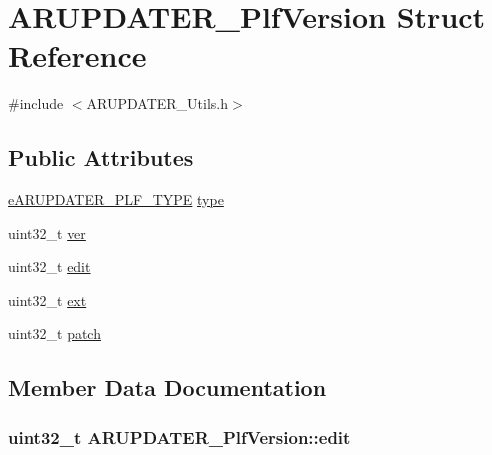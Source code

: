 \hypertarget{struct_a_r_u_p_d_a_t_e_r___plf_version}{}\section{A\+R\+U\+P\+D\+A\+T\+E\+R\+\_\+\+Plf\+Version Struct Reference}
\label{struct_a_r_u_p_d_a_t_e_r___plf_version}


{\ttfamily \#include $<$A\+R\+U\+P\+D\+A\+T\+E\+R\+\_\+\+Utils.\+h$>$}

\subsection*{Public Attributes}
\begin{DoxyCompactItemize}
\item 
\hyperlink{_a_r_u_p_d_a_t_e_r___utils_8h_a890af0861f945e8868b51f887db974bf}{e\+A\+R\+U\+P\+D\+A\+T\+E\+R\+\_\+\+P\+L\+F\+\_\+\+T\+Y\+PE} \hyperlink{struct_a_r_u_p_d_a_t_e_r___plf_version_ad632acaeefeb0f718b25434c5d867d37}{type}
\item 
uint32\+\_\+t \hyperlink{struct_a_r_u_p_d_a_t_e_r___plf_version_aa2c25655524d9c3ac6c2b0318276fd25}{ver}
\item 
uint32\+\_\+t \hyperlink{struct_a_r_u_p_d_a_t_e_r___plf_version_a0a8aae1a3c910fd2a5165f01b43d9b75}{edit}
\item 
uint32\+\_\+t \hyperlink{struct_a_r_u_p_d_a_t_e_r___plf_version_a817be406399018d71407a6dd936965e2}{ext}
\item 
uint32\+\_\+t \hyperlink{struct_a_r_u_p_d_a_t_e_r___plf_version_aa3c52e9afcc5f55c11cebb42e13a5732}{patch}
\end{DoxyCompactItemize}


\subsection{Member Data Documentation}
\subsubsection[{\texorpdfstring{edit}{edit}}]{\setlength{\rightskip}{0pt plus 5cm}uint32\+\_\+t A\+R\+U\+P\+D\+A\+T\+E\+R\+\_\+\+Plf\+Version\+::edit}\hypertarget{struct_a_r_u_p_d_a_t_e_r___plf_version_a0a8aae1a3c910fd2a5165f01b43d9b75}{}\label{struct_a_r_u_p_d_a_t_e_r___plf_version_a0a8aae1a3c910fd2a5165f01b43d9b75}
